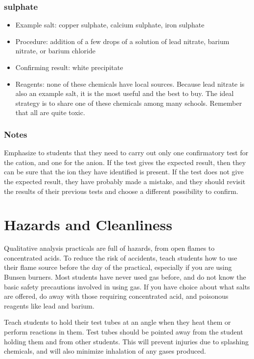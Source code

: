 \subsubsection{sulphate}
\begin{itemize}
\item{Example salt: copper sulphate, calcium sulphate, iron sulphate}
\item{Procedure: addition of a few drops of a solution of lead nitrate, 
barium nitrate, or barium chloride}
\item{Confirming result: white precipitate}
\item{Reagents: none of these chemicals have local sources. Because lead nitrate is also an example salt, it is the most useful and the best to buy. The ideal strategy is to share one of these chemicals among many schools. Remember that all are quite toxic.}
\end{itemize}

\subsubsection{Notes}

Emphasize to students that they need to carry out only one confirmatory test for the cation, 
and one for the anion. If the test gives the expected result, then they can be sure that the ion they have identified is present. If the test does not give the expected result, they have probably made a mistake, and they should revisit the results of their previous tests 
and choose a different possibility to confirm.

\section{Hazards and Cleanliness}
Qualitative analysis practicals are full of hazards, 
from open flames to concentrated acids. 
To reduce the risk of accidents, 
teach students how to use their flame source 
before the day of the practical, 
especially if you are using Bunsen burners. 
Most students have never used gas before, 
and do not know the basic safety precautions involved in using gas. 
If you have choice about what salts are offered, 
do away with those requiring concentrated acid, and poisonous reagents like lead and barium.

Teach students to hold their test tubes at an angle when they heat them or perform reactions in them. Test tubes should be pointed away from the student holding them and from other students. 
This will prevent injuries due to splashing chemicals, and will also minimize inhalation of any gases produced.


